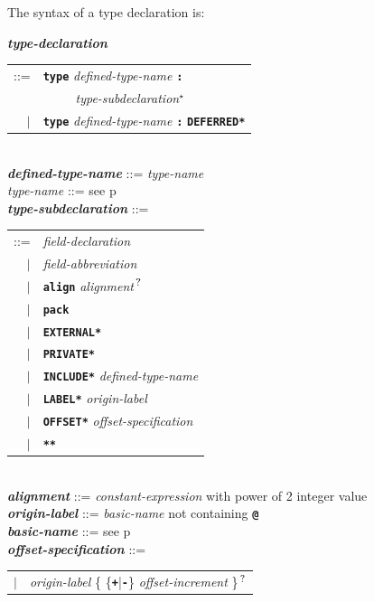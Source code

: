 \documentclass[12pt]{article}
\newcommand{\TT}[1]{{\tt \bfseries #1}}
\newcommand{\STAR}{{\Large $^\star$}}
\newcommand{\QMARK}{{$^{\,\mbox{\footnotesize ?}}$}}
\newcommand{\ttkey}[1]{{\tt \bfseries #1}}
\newcommand{\emkey}[1]{{\em \bfseries #1}}
\newcommand{\pagref}[1]{p\pageref{#1}}
\newenvironment{indpar}[1][0.3in]%
	{\begin{list}{}%
		     {\setlength{\itemsep}{0in}%
		      \setlength{\topsep}{0in}%
		      \setlength{\parsep}{1ex}%
		      \setlength{\labelwidth}{#1}%
		      \setlength{\leftmargin}{#1}%
		      \addtolength{\leftmargin}{\labelsep}}%
	 \item}%
	{\end{list}}
\begin{document}
The syntax of a type declaration is:

\begin{indpar}
\emkey{type-declaration}\label{TYPE-DECLARATION}
    \begin{tabular}[t]{rl}
    ::= & \ttkey{type} {\em defined-type-name} \TT{:} \\
	& \TT{~~~~~}{\em type-subdeclaration}\STAR{} \\
    $|$ & \ttkey{type} {\em defined-type-name} \TT{:} \ttkey{*DEFERRED*} \\
    \end{tabular} \\
\emkey{defined-type-name} ::= {\em type-name} \\
{\em type-name} ::= see \pagref{TYPE-NAME}
\\[2ex]
\emkey{type-subdeclaration} ::= \\
\hspace*{0.5in}%
    \begin{tabular}[t]{@{}rl}
    ::= &  {\em field-declaration} \\
    $|$ &  {\em field-abbreviation} \\
    $|$ &  \ttkey{align} {\em alignment}\QMARK{} \\
    $|$ &  \ttkey{pack} \\
    $|$ &  \ttkey{*EXTERNAL*} \\
    $|$ &  \ttkey{*PRIVATE*} \\
    $|$ &  \ttkey{*INCLUDE*} {\em defined-type-name} \\
    $|$ &  \ttkey{*LABEL*} {\em origin-label} \\
    $|$ &  \ttkey{*OFFSET*} {\em offset-specification} \\
    $|$ &  \ttkey{***} \\
    \end{tabular}
\\[2ex]
\emkey{alignment} ::= {\em constant-expression}
		      with power of 2 integer value \\
\emkey{origin-label}\label{ORIGIN-LABEL} ::=
    {\em basic-name} not containing \TT{@} \\
\emkey{basic-name} ::=  see \pagref{BASIC-NAME}
\\[2ex]
\emkey{offset-specification} ::= \\
\hspace*{0.5in}%
    \begin{tabular}[t]{@{}rl}
    $|$ &  {\em origin-label} \{ \{\TT{+}|\TT{-}\}
                            {\em offset-increment} \}\QMARK{} \\

\end{tabular}
\end{indpar}
\end{document}
